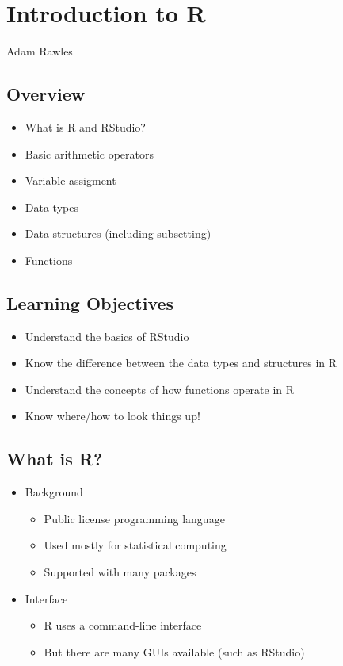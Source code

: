 \documentclass[]{article}
\title{}
\author{}
\date{}
\providecommand{\tightlist}{%
  \setlength{\itemsep}{0pt}\setlength{\parskip}{0pt}}
\begin{document}
\section{Introduction to R}\label{introduction-to-r}

Adam Rawles

\subsection{Overview}\label{overview}

\begin{itemize}
\tightlist
\item
  What is R and RStudio?
\item
  Basic arithmetic operators
\item
  Variable assigment
\item
  Data types
\item
  Data structures (including subsetting)
\item
  Functions
\end{itemize}

\subsection{Learning Objectives}\label{learning-objectives}

\begin{itemize}
\tightlist
\item
  Understand the basics of RStudio
\item
  Know the difference between the data types and structures in R
\item
  Understand the concepts of how functions operate in R
\item
  Know where/how to look things up!
\end{itemize}

\subsection{What is R?}\label{what-is-r}

\begin{itemize}
\tightlist
\item
  Background

  \begin{itemize}
  \tightlist
  \item
    Public license programming language
  \item
    Used mostly for statistical computing
  \item
    Supported with many packages
  \end{itemize}
\item
  Interface

  \begin{itemize}
  \tightlist
  \item
    R uses a command-line interface
  \item
    But there are many GUIs available (such as RStudio)
  \end{itemize}
\end{itemize}
\end{document}

